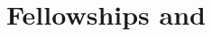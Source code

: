 \documentclass[letterpaper]{deedy-resume} %
\begin{document}
\begin{minipage}[t]{0.33\textwidth}







\vspace{15pt}

\section{Fellowships and}\vspace{-5pt}

\end{minipage}
\end{document}
